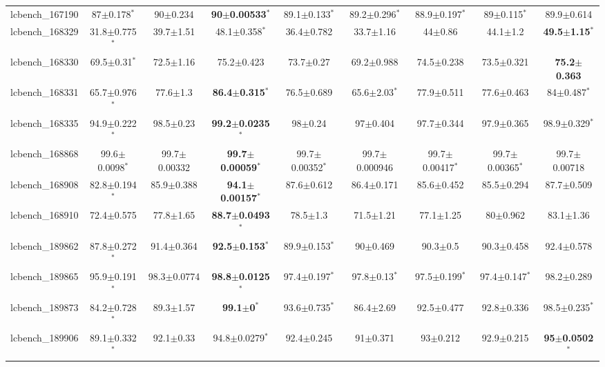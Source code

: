 \begin{table}[t]
\begin{center}
\begin{tabular}{lcccccccc}
lcbench\_167190 & 87$\pm$0.178$^{*}$ & 90$\pm$0.234 & \textbf{90$\pm$0.00533}$^{*}$ & 89.1$\pm$0.133$^{*}$ & 89.2$\pm$0.296$^{*}$ & 88.9$\pm$0.197$^{*}$ & 89$\pm$0.115$^{*}$ & 89.9$\pm$0.614 \\
lcbench\_168329 & 31.8$\pm$0.775$^{*}$ & 39.7$\pm$1.51 & 48.1$\pm$0.358$^{*}$ & 36.4$\pm$0.782 & 33.7$\pm$1.16 & 44$\pm$0.86 & 44.1$\pm$1.2 & \textbf{49.5$\pm$1.15}$^{*}$ \\
lcbench\_168330 & 69.5$\pm$0.31$^{*}$ & 72.5$\pm$1.16 & 75.2$\pm$0.423 & 73.7$\pm$0.27 & 69.2$\pm$0.988 & 74.5$\pm$0.238 & 73.5$\pm$0.321 & \textbf{75.2$\pm$0.363} \\
lcbench\_168331 & 65.7$\pm$0.976$^{*}$ & 77.6$\pm$1.3 & \textbf{86.4$\pm$0.315}$^{*}$ & 76.5$\pm$0.689 & 65.6$\pm$2.03$^{*}$ & 77.9$\pm$0.511 & 77.6$\pm$0.463 & 84$\pm$0.487$^{*}$ \\
lcbench\_168335 & 94.9$\pm$0.222$^{*}$ & 98.5$\pm$0.23 & \textbf{99.2$\pm$0.0235}$^{*}$ & 98$\pm$0.24 & 97$\pm$0.404 & 97.7$\pm$0.344 & 97.9$\pm$0.365 & 98.9$\pm$0.329$^{*}$ \\
lcbench\_168868 & 99.6$\pm$0.0098$^{*}$ & 99.7$\pm$0.00332 & \textbf{99.7$\pm$0.00059}$^{*}$ & 99.7$\pm$0.00352$^{*}$ & 99.7$\pm$0.000946 & 99.7$\pm$0.00417$^{*}$ & 99.7$\pm$0.00365$^{*}$ & 99.7$\pm$0.00718 \\
lcbench\_168908 & 82.8$\pm$0.194$^{*}$ & 85.9$\pm$0.388 & \textbf{94.1$\pm$0.00157}$^{*}$ & 87.6$\pm$0.612 & 86.4$\pm$0.171 & 85.6$\pm$0.452 & 85.5$\pm$0.294 & 87.7$\pm$0.509 \\
lcbench\_168910 & 72.4$\pm$0.575 & 77.8$\pm$1.65 & \textbf{88.7$\pm$0.0493}$^{*}$ & 78.5$\pm$1.3 & 71.5$\pm$1.21 & 77.1$\pm$1.25 & 80$\pm$0.962 & 83.1$\pm$1.36 \\
lcbench\_189862 & 87.8$\pm$0.272$^{*}$ & 91.4$\pm$0.364 & \textbf{92.5$\pm$0.153}$^{*}$ & 89.9$\pm$0.153$^{*}$ & 90$\pm$0.469 & 90.3$\pm$0.5 & 90.3$\pm$0.458 & 92.4$\pm$0.578 \\
lcbench\_189865 & 95.9$\pm$0.191$^{*}$ & 98.3$\pm$0.0774 & \textbf{98.8$\pm$0.0125}$^{*}$ & 97.4$\pm$0.197$^{*}$ & 97.8$\pm$0.13$^{*}$ & 97.5$\pm$0.199$^{*}$ & 97.4$\pm$0.147$^{*}$ & 98.2$\pm$0.289 \\
lcbench\_189873 & 84.2$\pm$0.728$^{*}$ & 89.3$\pm$1.57 & \textbf{99.1$\pm$0}$^{*}$ & 93.6$\pm$0.735$^{*}$ & 86.4$\pm$2.69 & 92.5$\pm$0.477 & 92.8$\pm$0.336 & 98.5$\pm$0.235$^{*}$ \\
lcbench\_189906 & 89.1$\pm$0.332$^{*}$ & 92.1$\pm$0.33 & 94.8$\pm$0.0279$^{*}$ & 92.4$\pm$0.245 & 91$\pm$0.371 & 93$\pm$0.212 & 92.9$\pm$0.215 & \textbf{95$\pm$0.0502}$^{*}$ \\

\end{tabular}
\end{center}
\end{table}
